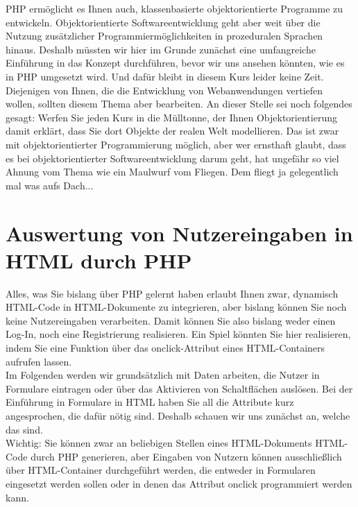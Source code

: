 PHP ermöglicht es Ihnen auch, klassenbasierte objektorientierte Programme zu entwickeln. Objektorientierte Softwareentwicklung geht aber weit über die Nutzung zusätzlicher Programmiermöglichkeiten in prozeduralen Sprachen hinaus. Deshalb müssten wir hier im Grunde zunächst eine umfangreiche Einführung in das Konzept durchführen, bevor wir uns ansehen könnten, wie es in PHP umgesetzt wird. Und dafür bleibt in diesem Kurs leider keine Zeit.\\

Diejenigen von Ihnen, die die Entwicklung von Webanwendungen vertiefen wollen, sollten diesem Thema aber bearbeiten. An dieser Stelle sei noch folgendes gesagt: Werfen Sie jeden Kurs in die Mülltonne, der Ihnen Objektorientierung damit erklärt, dass Sie dort Objekte der realen Welt modellieren. Das ist zwar mit objektorientierter Programmierung möglich, aber wer ernsthaft glaubt, dass es bei objektorientierter Softwareentwicklung darum geht, hat ungefähr so viel Ahnung vom Thema wie ein Maulwurf vom Fliegen. Dem fliegt ja gelegentlich mal was aufs Dach...

\section{Auswertung von Nutzereingaben in HTML durch PHP}

Alles, was Sie bislang über PHP gelernt haben erlaubt Ihnen zwar, dynamisch HTML-Code in HTML-Dokumente zu integrieren, aber bislang können Sie noch keine Nutzereingaben verarbeiten. Damit können Sie also bislang weder einen Log-In, noch eine Registrierung realisieren. Ein Spiel könnten Sie hier realisieren, indem Sie eine Funktion über das onclick-Attribut eines HTML-Containers aufrufen lassen.\\

Im Folgenden werden wir grundsätzlich mit Daten arbeiten, die Nutzer in Formulare eintragen oder über das Aktivieren von Schaltflächen auslösen. Bei der Einführung in Formulare in HTML haben Sie all die Attribute kurz angesprochen, die dafür nötig sind. Deshalb schauen wir uns zunächst an, welche das sind.\\

Wichtig: Sie können zwar an beliebigen Stellen eines HTML-Dokuments HTML-Code durch PHP generieren, aber Eingaben von Nutzern können ausschließlich über HTML-Container durchgeführt werden, die entweder in Formularen eingesetzt werden sollen oder in denen das Attribut onclick programmiert werden kann.\\

